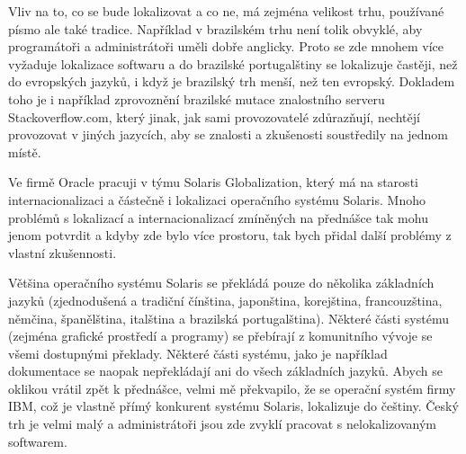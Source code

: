 \documentclass[12pt,a4paper]{report}
\begin{document}
Vliv na to, co se bude lokalizovat a co ne, má zejména velikost trhu, používané
písmo ale také tradice. Například v brazilském trhu není tolik obvyklé, aby
programátoři a administrátoři uměli dobře anglicky.  Proto se zde mnohem více
vyžaduje lokalizace softwaru a do brazilské portugalštiny se lokalizuje
častěji, než do evropských jazyků, i když je brazilský trh menší, než ten
evropský. Dokladem toho je i například zprovoznění brazilské mutace znalostního
serveru Stackoverflow.com, který jinak, jak sami provozovatelé zdůrazňují,
nechtějí provozovat v jiných jazycích, aby se znalosti a zkušenosti soustředily
na jednom místě.

Ve firmě Oracle pracuji v týmu Solaris Globalization, který má na starosti
internacionalizaci a částečně i lokalizaci operačního systému Solaris.  Mnoho
problémů s lokalizací a internacionalizací zmíněných na přednášce tak mohu
jenom potvrdit a kdyby zde bylo více prostoru, tak bych přidal další problémy z
vlastní zkušennosti.

Většina operačního systému Solaris se překládá pouze do několika základních
jazyků (zjednodušená a tradiční čínština, japonština, korejština,
francouzština, němčina, španělština, italština a brazilská portugalština).
Některé části systému (zejména grafické prostředí a programy) se přebírají z
komunitního vývoje se všemi dostupnými překlady. Některé části systému, jako je
například dokumentace se naopak nepřekládají ani do všech základních jazyků.
Abych se oklikou vrátil zpět k přednášce, velmi mě překvapilo, že se operační
systém firmy IBM, což je vlastně přímý konkurent systému Solaris, lokalizuje do
češtiny. Český trh je velmi malý a administrátoři jsou zde zvyklí pracovat s
nelokalizovaným softwarem.
\end{document}
